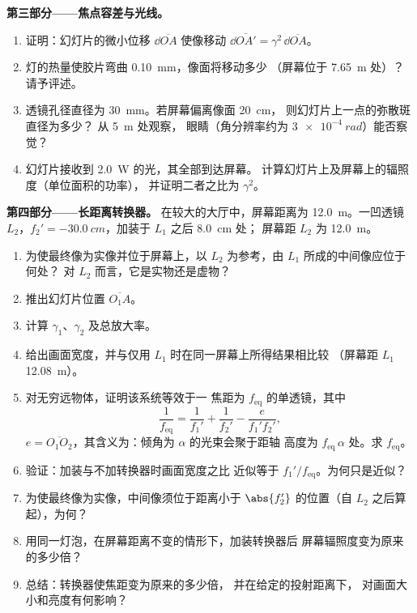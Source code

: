 \begin{problem}
\medskip
\noindent\textbf{第三部分——焦点容差与光线。}
\begin{enumerate}[resume]
  \item 证明：幻灯片的微小位移 $\dd\overline{OA}$
        使像移动 $\dd\overline{OA'} = \gamma^2\,\dd\overline{OA}$。
  \item 灯的热量使胶片弯曲 \qty{0.10}{mm}，像面将移动多少
        （屏幕位于 \qty{7.65}{m} 处）？
        请予评述。
  \item 透镜孔径直径为 \qty{30}{mm}。若屏幕偏离像面 \qty{20}{cm}，
        则幻灯片上一点的弥散斑直径为多少？
        从 \qty{5}{m} 处观察，
        眼睛（角分辨率约为 $\qty{3e-4}{rad}$）能否察觉？
  \item 幻灯片接收到 \qty{2.0}{W} 的光，其全部到达屏幕。
        计算幻灯片上及屏幕上的辐照度（单位面积的功率），
        并证明二者之比为 $\gamma^2$。
\end{enumerate}

\medskip
\noindent\textbf{第四部分——长距离转换器。}
在较大的大厅中，屏幕距离为 \qty{12.0}{m}。一凹透镜
$L_2$，$f_2' = \qty{-30.0}{cm}$，加装于 $L_1$ 之后 \qty{8.0}{cm} 处；
屏幕距 $L_2$ 为 \qty{12.0}{m}。
\begin{enumerate}[resume]
  \item 为使最终像为实像并位于屏幕上，以
        $L_2$ 为参考，由 $L_1$ 所成的中间像应位于何处？
        对 $L_2$ 而言，它是实物还是虚物？
  \item 推出幻灯片位置 $\overline{O_1A}$。
  \item 计算 $\gamma_1$、$\gamma_2$ 及总放大率。
  \item 给出画面宽度，并与仅用 $L_1$ 时在同一屏幕上所得结果相比较
        （屏幕距 $L_1$ \qty{12.08}{m}）。
  \item 对无穷远物体，证明该系统等效于一
        焦距为 $f_{\mathrm{eq}}$ 的单透镜，其中
        \[
        \frac{1}{f_{\mathrm{eq}}} = \frac{1}{f_1'} + \frac{1}{f_2'} - \frac{e}{f_1' f_2'},
        \]
        $e = \overline{O_1O_2}$，其含义为：倾角为
        $\alpha$ 的光束会聚于距轴
        高度为 $f_{\mathrm{eq}}\,\alpha$ 处。求 $f_{\mathrm{eq}}$。
  \item 验证：加装与不加转换器时画面宽度之比
        近似等于 $f_1'/f_{\mathrm{eq}}$。为何只是近似？
  \item 为使最终像为实像，中间像须位于距离小于 $\abs{f_2'}$
        的位置（自 $L_2$ 之后算起），为何？
  \item 用同一灯泡，在屏幕距离不变的情形下，加装转换器后
        屏幕辐照度变为原来的多少倍？
  \item 总结：转换器使焦距变为原来的多少倍，
        并在给定的投射距离下，
        对画面大小和亮度有何影响？
\end{enumerate}
\end{problem}
